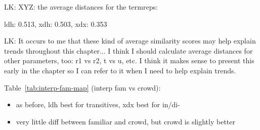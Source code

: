 LK: XYZ: the average distances for the termreps:

ldh: 0.513, xdh: 0.503, xdx: 0.353

LK: It occurs to me that these kind of average similarity scores may help explain trends throughout this chapter... I think I should calculate average distances for other parameters, too: r1 vs r2, t vs u, etc. I think it makes sense to present this early in the chapter so I can refer to it when I need to help explain trends.

\bigskip

Table~\ref{tab:interp-fam-map} (interp fam vs crowd):
\begin{itemize}
\item{as before, ldh best for transitives, xdx best for in/di-}
\item{very little diff between familiar and crowd, but crowd is slightly better}
\end{itemize}


